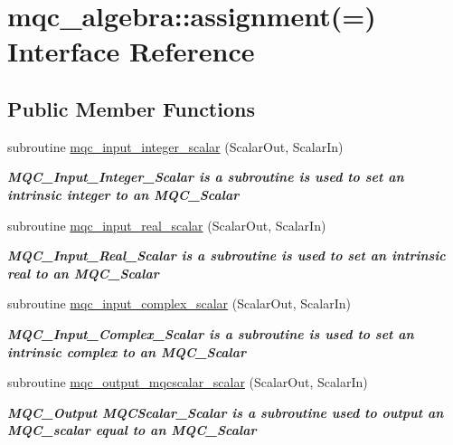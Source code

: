 \hypertarget{interfacemqc__algebra_1_1assignment_07_0A_08}{}\section{mqc\+\_\+algebra\+::assignment(=) Interface Reference}
\label{interfacemqc__algebra_1_1assignment_07_0A_08}
\subsection*{Public Member Functions}
\begin{DoxyCompactItemize}
\item 
subroutine \mbox{\hyperlink{interfacemqc__algebra_1_1assignment_07_0A_08_af443e981d0c13e74c8f09b4d6a373114}{mqc\+\_\+input\+\_\+integer\+\_\+scalar}} (Scalar\+Out, Scalar\+In)
\begin{DoxyCompactList}\small\item\em {\bfseries{ M\+Q\+C\+\_\+\+Input\+\_\+\+Integer\+\_\+\+Scalar is a subroutine is used to set an intrinsic integer to an M\+Q\+C\+\_\+\+Scalar}} \end{DoxyCompactList}\item 
subroutine \mbox{\hyperlink{interfacemqc__algebra_1_1assignment_07_0A_08_a1e437ba434103c530ef5e6f4a9de736b}{mqc\+\_\+input\+\_\+real\+\_\+scalar}} (Scalar\+Out, Scalar\+In)
\begin{DoxyCompactList}\small\item\em {\bfseries{ M\+Q\+C\+\_\+\+Input\+\_\+\+Real\+\_\+\+Scalar is a subroutine is used to set an intrinsic real to an M\+Q\+C\+\_\+\+Scalar}} \end{DoxyCompactList}\item 
subroutine \mbox{\hyperlink{interfacemqc__algebra_1_1assignment_07_0A_08_a7b6632609bbcd90b2baf561c9d0c6718}{mqc\+\_\+input\+\_\+complex\+\_\+scalar}} (Scalar\+Out, Scalar\+In)
\begin{DoxyCompactList}\small\item\em {\bfseries{ M\+Q\+C\+\_\+\+Input\+\_\+\+Complex\+\_\+\+Scalar is a subroutine is used to set an intrinsic complex to an M\+Q\+C\+\_\+\+Scalar}} \end{DoxyCompactList}\item 
subroutine \mbox{\hyperlink{interfacemqc__algebra_1_1assignment_07_0A_08_a78c94526bb968085ec8938d5400c89da}{mqc\+\_\+output\+\_\+mqcscalar\+\_\+scalar}} (Scalar\+Out, Scalar\+In)
\begin{DoxyCompactList}\small\item\em {\bfseries{ M\+Q\+C\+\_\+\+Output M\+Q\+C\+Scalar\+\_\+\+Scalar is a subroutine used to output an M\+Q\+C\+\_\+scalar equal to an M\+Q\+C\+\_\+\+Scalar}} \end{DoxyCompactList}\item 

\end{DoxyCompactItemize}
